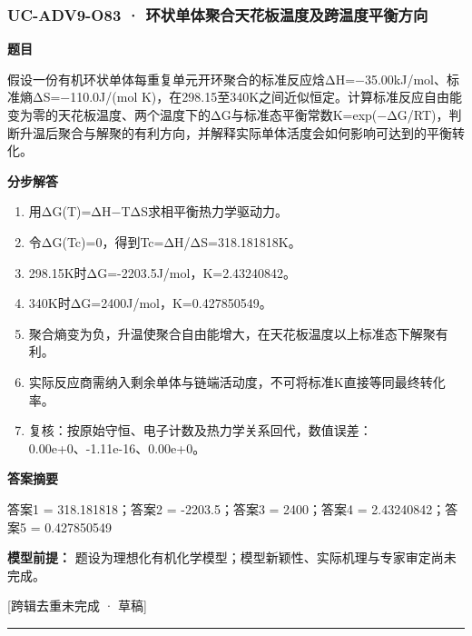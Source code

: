 \documentclass[UTF8,11pt,a4paper]{ctexart}
\begin{document}
\subsubsection*{UC-ADV9-O83 · 环状单体聚合天花板温度及跨温度平衡方向}
\noindent\textbf{题目}\par
假设一份有机环状单体每重复单元开环聚合的标准反应焓ΔH=−35.00kJ/mol、标准熵ΔS=−110.0J/(mol K)，在298.15至340K之间近似恒定。计算标准反应自由能变为零的天花板温度、两个温度下的ΔG与标准态平衡常数K=exp(−ΔG/RT)，判断升温后聚合与解聚的有利方向，并解释实际单体活度会如何影响可达到的平衡转化。\par
\medskip\noindent\textbf{分步解答}
\begin{enumerate}
\item 用ΔG(T)=ΔH−TΔS求相平衡热力学驱动力。
\item 令ΔG(Tc)=0，得到Tc=ΔH/ΔS=318.181818K。
\item 298.15K时ΔG=-2203.5J/mol，K=2.43240842。
\item 340K时ΔG=2400J/mol，K=0.427850549。
\item 聚合熵变为负，升温使聚合自由能增大，在天花板温度以上标准态下解聚有利。
\item 实际反应商需纳入剩余单体与链端活动度，不可将标准K直接等同最终转化率。
\item 复核：按原始守恒、电子计数及热力学关系回代，数值误差：0.00e+0、-1.11e-16、0.00e+0。
\end{enumerate}
\noindent\textbf{答案摘要}\par
答案1 = 318.181818；答案2 = -2203.5；答案3 = 2400；答案4 = 2.43240842；答案5 = 0.427850549\par
\noindent\textbf{模型前提：}
题设为理想化有机化学模型；模型新颖性、实际机理与专家审定尚未完成。\par
\noindent\textcolor{red!65!black}{[跨辑去重未完成 · 草稿]} \par
\medskip\hrule\medskip
{}
\end{document}
